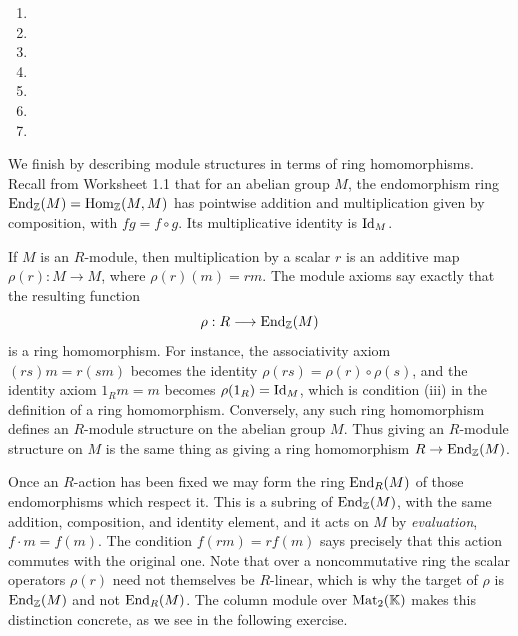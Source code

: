 \documentclass[Notebook.tex]{subfiles}
\begin{document}
\begin{solution}
	\bbni
	\begin{enumerate}[label=(\alph*),ref=\theenumi\alph*]
		\item
		\item
		\item
		\item
		\item
		\item
		\item
	\end{enumerate}
\end{solution}

\newpage

We finish by describing module structures in terms of ring homomorphisms. Recall from Worksheet 1.1 that for an abelian group $M$, the endomorphism ring $\operatorname{End}_{\mathbb Z}(M)=\operatorname{Hom}_{\mathbb Z}(M,M)$ has pointwise addition and multiplication given by composition, with $fg=f\circ g$. Its multiplicative identity is $\operatorname{Id}_M$.

If $M$ is an $R$-module, then multiplication by a scalar $r$ is an additive map $\rho(r):M\to M$, where $\rho(r)(m)=rm$. The module axioms say exactly that the resulting function
\[
\rho:R\longrightarrow\operatorname{End}_{\mathbb Z}(M)
\]
is a ring homomorphism. For instance, the associativity axiom $(rs)m=r(sm)$ becomes the identity $\rho(rs)=\rho(r)\circ\rho(s)$, and the identity axiom $1_Rm=m$ becomes $\rho(1_R)=\operatorname{Id}_M$, which is condition (iii) in the definition of a ring homomorphism. Conversely, any such ring homomorphism defines an $R$-module structure on the abelian group $M$. Thus giving an $R$-module structure on $M$ is the same thing as giving a ring homomorphism $R\to\operatorname{End}_{\mathbb Z}(M)$.

Once an $R$-action has been fixed we may form the ring $\operatorname{End}_R(M)$ of those endomorphisms which respect it. This is a subring of $\operatorname{End}_{\mathbb Z}(M)$, with the same addition, composition, and identity element, and it acts on $M$ by \emph{evaluation}, $f\cdot m=f(m)$. The condition $f(rm)=rf(m)$ says precisely that this action commutes with the original one. Note that over a noncommutative ring the scalar operators $\rho(r)$ need not themselves be $R$-linear, which is why the target of $\rho$ is $\operatorname{End}_{\mathbb Z}(M)$ and not $\operatorname{End}_R(M)$. The column module over $\operatorname{Mat}_2(\mathbb K)$ makes this distinction concrete, as we see in the following exercise.

\hrulefill
\end{document}
